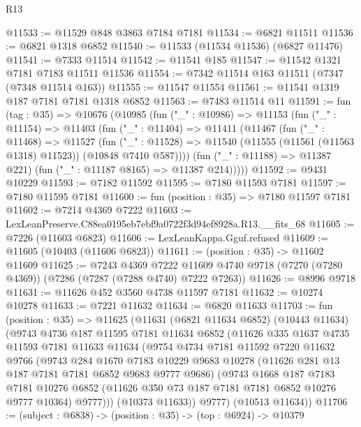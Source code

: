 \begin{lexlean}{R13}
\begin{coremodule}
@11533 := @11529 @848 @3863 @7184 @7181
@11534 := @6821 @11511
@11536 := @6821 @1318 @6852
@11540 := @11533 (@11534 @11536) (@6827 @11476)
@11541 := @7333 @11514
@11542 := @11541 @185
@11547 := @11542 @1321 @7181 @7183 @11511 @11536
@11554 := @7342 @11514 @163 @11511 (@7347 (@7348 @11514 @163))
@11555 := @11547 @11554
@11561 := @11541 @1319 @187 @7181 @7181 @1318 @6852
@11563 := @7483 @11514 @11
@11591 := fun (tag : @35) =>
  @10676
    (@10985
      (fun ("_" : @10986) =>
      @11153
        (fun ("_" : @11154) =>
        @11403
          (fun ("_" : @11404) =>
          @11411
            (@11467
              (fun ("_" : @11468) =>
              @11527
                (fun ("_" : @11528) =>
                @11540 (@11555 (@11561 (@11563 @1318) @11523)) (@10848 @7410 @587))))
            (fun ("_" : @11188) => @11387 @221)
            (fun ("_" : @11187 @8165) => @11387 @214)))))
@11592 := @9431 @10229
@11593 := @7182 @11592
@11595 := @7180 @11593 @7181
@11597 := @7180 @11595 @7181
@11600 := fun (position : @35) => @7180 @11597 @7181
@11602 := @7214 @4369 @7222
@11603 := LexLeanPreserve.C88ea0195eb7ebf9a0722f3d94ef8928a.R13.__fits_68
@11605 := @7226 (@11603 @6823)
@11606 := LexLeanKappa.Gguf.refused
@11609 := @11605 (@10403 (@11606 @6823))
@11611 := (position : @35) -> @11602 @11609
@11625 := @7243
    @4369
    @7222
    @11609
    @4740
    @9718
    (@7270 (@7280 @4369))
    (@7286 (@7287 (@7288 @4740) @7222 @7263))
@11626 := @8996 @9718
@11631 := @11626 @452 @3560 @4738 @11597 @7181
@11632 := @10274 @10278
@11633 := @7221 @11632
@11634 := @6820 @11633
@11703 := fun (position : @35) =>
  @11625
    (@11631
      (@6821 @11634 @6852)
      (@10443 @11634)
      (@9743
        @4736
        @187
        @11595
        @7181
        @11634
        @6852
        (@11626
          @335
          @1637
          @4735
          @11593
          @7181
          @11633
          @11634
          (@9754
            @4734
            @7181
            @11592
            @7220
            @11632
            @9766
            (@9743
              @284
              @1670
              @7183
              @10229
              @9683
              @10278
              (@11626 @281 @13 @187 @7181 @7181 @6852 @9683 @9777 @9686)
              (@9743
                @1668
                @187
                @7183
                @7181
                @10276
                @6852
                (@11626 @350 @73 @187 @7181 @7181 @6852 @10276 @9777 @10364)
                @9777)))
          (@10373 @11633))
        @9777)
      (@10513 @11634))
@11706 := (subject : @6838) -> (position : @35) -> (top : @6924) -> @10379

\end{coremodule}
\end{lexlean}
